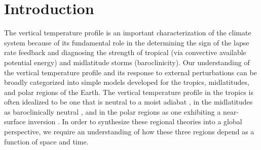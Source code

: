 \documentclass{ametsocV5}
\begin{document}



\section{Introduction}

    The vertical temperature profile is an important characterization of the climate system because of its fundamental role in the determining the sign of the lapse rate feedback and diagnosing the strength of tropical (via convective available potential energy) and midlatitude storms (baroclinicity). Our understanding of the vertical temperature profile and its response to external perturbations can be broadly categorized into simple models developed for the tropics, midlatitudes, and polar regions of the Earth. The vertical temperature profile in the tropics is often idealized to be one that is neutral to a moist adiabat \citep{held1982,xu1989}, in the midlatitudes as baroclinically neutral \citep{stone1978,lindzen1993}, and in the polar regions as one exhibiting a near-surface inversion \citep{cronin2016}. In order to synthesize these regional theories into a global perspective, we require an understanding of how these three regions depend as a function of space and time.
\end{document}
